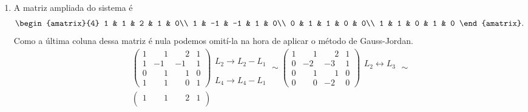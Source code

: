 \begin{exemplo}
\begin{solucao}
\begin{enumerate}
            \item A matriz ampliada do sistema é
                \[
                    \begin{amatrix}{4}
                        1 & 1 & 2 & 1 & 0\\
                        1 & -1 & -1 & 1 & 0\\
                        0 & 1 & 1 & 0 & 0\\
                        1 & 1 & 0 & 1 & 0
                    \end{amatrix}.
                \]
            Como a última coluna dessa matriz é nula podemos omití-la na hora de aplicar o método de Gauss-Jordan.
            \begin{align*}
                &\begin{pmatrix}
                    1 &\phantom{-} 1 &\phantom{-} 2 & 1\\
                    1 & -1 & -1 & 1\\
                    0 &\phantom{-} 1 &\phantom{-} 1 & 0\\
                    1 &\phantom{-} 1 &\phantom{-} 0 & 1
                \end{pmatrix}
                \begin{array}{l}
                    \phantom{x}\\L_2 \to L_2 - L_1\\\phantom{x}\\L_4 \to L_4 - L_1
                \end{array}\sim
                \begin{pmatrix}
                    1 &\phantom{-} 1 &\phantom{-} 2 & 1\\
                    0 & -2 & -3 & 1\\
                    0 &\phantom{-} 1 &\phantom{-} 1 & 0\\
                    0 &\phantom{-} 0 & -2 & 0
                \end{pmatrix}
                \begin{array}{l}
                    \phantom{x}\\L_2 \leftrightarrow L_3\\\phantom{x}\\\phantom{x}
                \end{array}\sim\\
                &\begin{pmatrix}
                    1 &\phantom{-} 1 &\phantom{-} 2 & 1\\

\end{pmatrix}
\end{align*}
\end{enumerate}
\end{solucao}
\end{exemplo}
